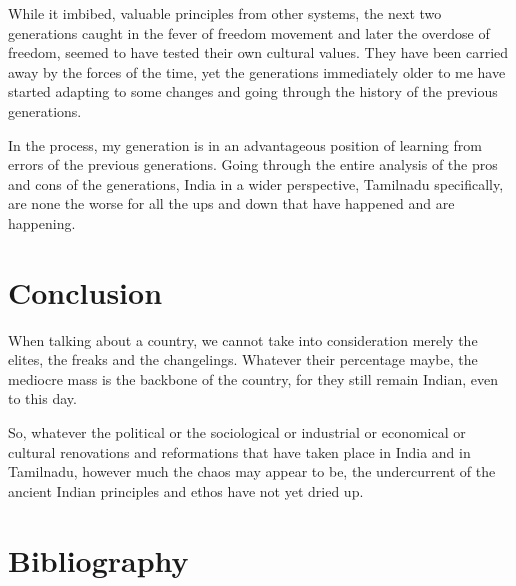 While it imbibed, valuable principles from other systems, the next two generations caught in the fever of freedom movement and later the overdose of freedom, seemed to have tested their own cultural values. They have been carried away by the forces of the time, yet the generations immediately older to me have started adapting to some changes and going through the history of the previous generations.

In the process, my generation is in an advantageous position of learning from errors of the previous generations. Going through the entire analysis of the pros and cons of the generations, India in a wider perspective, Tamilnadu specifically, are none the worse for all the ups and down that have happened and are happening.


\section*{Conclusion}

\vskip -5pt

When talking about a country, we cannot take into consideration merely the elites, the freaks and the changelings. Whatever their percentage maybe, the mediocre mass is the backbone of the country, for they still remain Indian, even to this day.

So, whatever the political or the sociological or industrial or economical or cultural renovations and reformations that have taken place in India and in Tamilnadu, however much the chaos may appear to be, the undercurrent of the ancient Indian principles and ethos have not yet dried up.


\section*{Bibliography}


